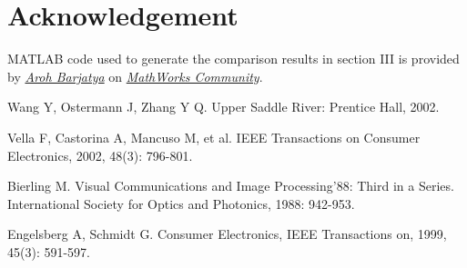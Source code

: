 \documentclass[a4paper, twocolumn]{article}
\begin{document}
	\section{Acknowledgement}
	MATLAB code used to generate the comparison results in section III is provided by \href{http://www.mathworks.com/matlabcentral/profile/authors/870112-aroh-barjatya}{\textit{Aroh Barjatya}} on \href{http://www.mathworks.com/matlabcentral/fileexchange/8761-block-matching-algorithms-for-motion-estimation}{\textit{MathWorks Community}}.

	
	\begin{thebibliography}{99} %
		
		Wang Y, Ostermann J, Zhang Y Q. 
		\newblock Upper Saddle River: Prentice Hall, 2002.
		
		Vella F, Castorina A, Mancuso M, et al. 
		\newblock IEEE Transactions on Consumer Electronics, 2002, 48(3): 796-801.
		
		Bierling M. 
		\newblock Visual Communications and Image Processing'88: Third in a Series. International Society for Optics and Photonics, 1988: 942-953.
		
		Engelsberg A, Schmidt G. 
		\newblock Consumer Electronics, IEEE Transactions on, 1999, 45(3): 591-597.
		
	\end{thebibliography}
	
	
\end{document}
